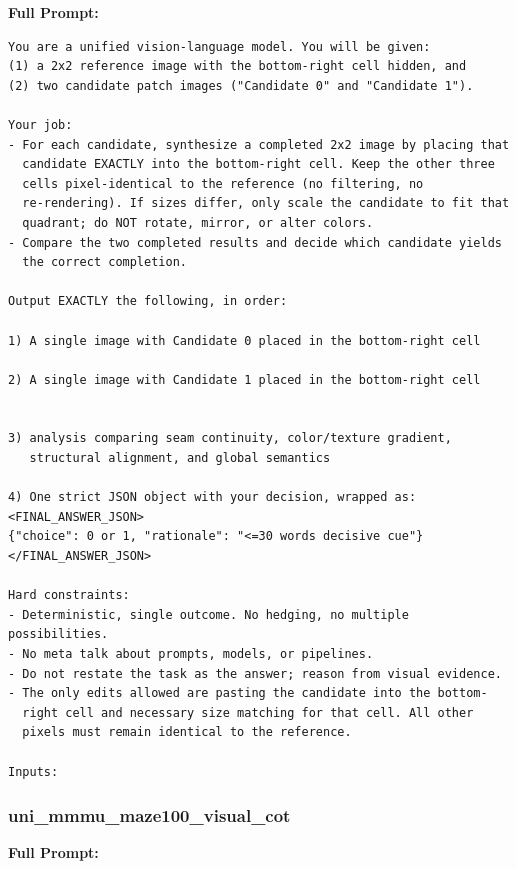 \documentclass{article}
\theoremstyle{plain}
\theoremstyle{definition}
\theoremstyle{remark}
\begin{document}
\textbf{Full Prompt:}

\begin{verbatim}
You are a unified vision-language model. You will be given:
(1) a 2x2 reference image with the bottom-right cell hidden, and
(2) two candidate patch images ("Candidate 0" and "Candidate 1").

Your job:
- For each candidate, synthesize a completed 2x2 image by placing that
  candidate EXACTLY into the bottom-right cell. Keep the other three
  cells pixel-identical to the reference (no filtering, no
  re-rendering). If sizes differ, only scale the candidate to fit that
  quadrant; do NOT rotate, mirror, or alter colors.
- Compare the two completed results and decide which candidate yields
  the correct completion.

Output EXACTLY the following, in order:

1) A single image with Candidate 0 placed in the bottom-right cell

2) A single image with Candidate 1 placed in the bottom-right cell


3) analysis comparing seam continuity, color/texture gradient,
   structural alignment, and global semantics

4) One strict JSON object with your decision, wrapped as:
<FINAL_ANSWER_JSON>
{"choice": 0 or 1, "rationale": "<=30 words decisive cue"}
</FINAL_ANSWER_JSON>

Hard constraints:
- Deterministic, single outcome. No hedging, no multiple possibilities.
- No meta talk about prompts, models, or pipelines.
- Do not restate the task as the answer; reason from visual evidence.
- The only edits allowed are pasting the candidate into the bottom-
  right cell and necessary size matching for that cell. All other
  pixels must remain identical to the reference.

Inputs:
\end{verbatim}

\subsubsection{uni\_mmmu\_maze100\_visual\_cot}

\textbf{Full Prompt:}
\end{document}
